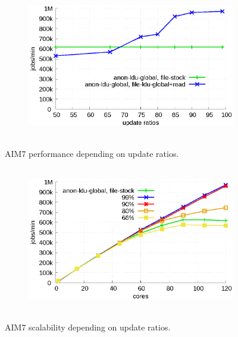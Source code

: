\begin{figure}[t!]
    \centering
    \begin{subfigure}[b]{1\textwidth}
  \begin{center}
        \includegraphics[height=2.5in]{graph/ratio_aim7.eps}
  \end{center}
    \end{subfigure}%
    \caption{AIM7 performance depending on update ratios.}
    \label{fig:UpdateRate_aim7}
\end{figure}

\begin{figure}[t!]
    \centering
    \begin{subfigure}[b]{1\textwidth}
        \includegraphics[height=2.5in]{graph/ratio_aim7_core.eps}
    \end{subfigure}%
    \caption{AIM7 scalability depending on update ratios.}
    \label{fig:UpdateRate_aim7_2}
\end{figure}


